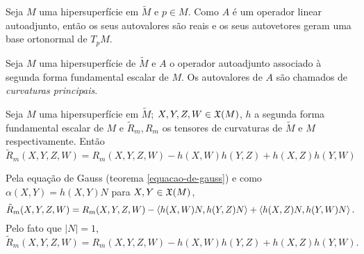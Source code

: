 \begin{observacao}
	Seja $M$ uma hipersuperfície em $\tilde{M}$ e
	$p \in M$.
	Como $A$ é um operador linear autoadjunto, então os seus autovalores são reais e os seus autovetores geram uma base ortonormal de $T_p M$.
\end{observacao}

\begin{definicao}
	Seja $M$ uma hipersuperfície de $\tilde{M}$ e
	$A$ o operador autoadjunto associado à segunda forma fundamental escalar de $M$.
	Os autovalores de $A$ são chamados de \emph{curvaturas principais}.
\end{definicao}


\begin{corolario}\label{equacao-de-gauss-hipersuperficies}
	Seja $M$ uma hipersuperfície em $\tilde{M}$;
	$X,Y,Z,W \in \mathfrak{X}(M)$,
	$h$ a segunda forma fundamental escalar de $M$ e
	$\tilde{R}_m, R_m$ os tensores de curvaturas de $\tilde{M}$ e $M$ respectivamente.
	Então
	\begin{equation*}
		\tilde{R}_m(X,Y,Z,W) = R_m(X,Y,Z,W) - h(X,W) h(Y,Z) + h(X,Z) h(Y,W)
	\end{equation*}
\end{corolario}

\begin{demonstracao}
	Pela equação de Gauss (teorema \ref{equacao-de-gauss}) e como $\alpha(X,Y)= h(X,Y) N$ para $X,Y \in \mathfrak{X}(M)$,
	\begin{equation*}
	\tilde{R}_m(X,Y,Z,W) = R_m(X,Y,Z,W) - \left\langle h(X,W) N,h(Y,Z) N \right\rangle + \left\langle h(X,Z)N,h(Y,W)N \right\rangle.
	\end{equation*}
	Pelo fato que $|N|=1$,
	\begin{equation*}
	\tilde{R}_m(X,Y,Z,W) = R_m(X,Y,Z,W) - h(X,W) h(Y,Z) + h(X,Z) h(Y,W).
	\end{equation*}
\end{demonstracao}



